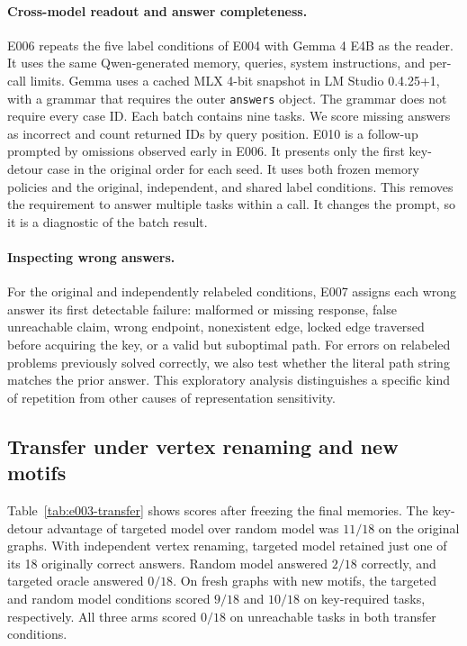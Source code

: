 \documentclass[11pt]{article}
\begin{document}
\paragraph{Cross-model readout and answer completeness.}
E006 repeats the five label conditions of E004 with Gemma 4 E4B
\cite{gemma4} as the reader. It uses the same Qwen-generated memory,
queries,
system instructions, and per-call limits. Gemma uses a cached MLX
4-bit snapshot in LM Studio 0.4.25+1, with a grammar that requires the
outer \texttt{answers} object. The grammar does not require every
case ID. Each batch contains nine tasks. We score missing answers
as incorrect and count returned IDs by query position. E010
is a follow-up prompted by omissions observed early in E006.
It presents only the first key-detour case in the original order
for each seed. It uses both frozen memory policies and the
original, independent, and shared label conditions. This removes
the requirement to answer multiple tasks within a call. It
changes the prompt, so it is a diagnostic of the batch result.

\paragraph{Inspecting wrong answers.}
For the original and independently relabeled conditions, E007 assigns
each wrong answer its first detectable failure: malformed or missing
response, false unreachable claim, wrong endpoint, nonexistent edge,
locked edge traversed before acquiring the key, or a valid but
suboptimal path. For errors on relabeled problems previously solved
correctly, we also test whether the literal path string matches
the prior answer. This exploratory analysis distinguishes a specific
kind of repetition from other causes of representation sensitivity.

\subsection{Transfer under vertex renaming and new motifs}

Table~\ref{tab:e003-transfer} shows scores after freezing the final
memories. The key-detour advantage of targeted model over random
model was $11/18$ on the original graphs. With independent vertex
renaming, targeted model retained just one of its 18 originally
correct answers. Random model answered $2/18$ correctly, and
targeted oracle answered $0/18$. On fresh graphs with new motifs,
the targeted and random model conditions scored $9/18$ and
$10/18$ on key-required tasks, respectively. All three arms scored
$0/18$ on unreachable tasks in both transfer conditions.
\end{document}

